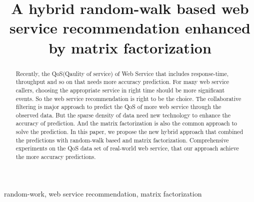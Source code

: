 \documentclass[conference]{IEEEtran}
\begin{document}
\title{A hybrid random-walk based web service recommendation enhanced by matrix factorization}

\author{
  \and
}

\maketitle

\begin{abstract}
Recently, the QoS(Qaulity of service) of Web Service that includes response-time, throughput and so on that needs more accuracy prediction. For many web service  callers, choosing the appropriate service in right time should be more significant events. So the web service recommendation is right to be the choice. The collaborative filtering is major approach to predict the QoS of more web service through the observed data. But the sparse density of data need new technology to enhance the accuracy of prediction. And the matrix factorization is also the common approach to solve the prediction. In this paper, we propose the new hybrid approach that combined the predictions with random-walk based and matrix factorization. Comprehensive experiments on the QoS data set of real-world web service, that our approach achieve the more accuracy predictions.
\end{abstract}

\begin{IEEEkeywords}
  random-work, web service recommendation, matrix factorization
\end{IEEEkeywords}

\IEEEpeerreviewmaketitle

\end{document}
